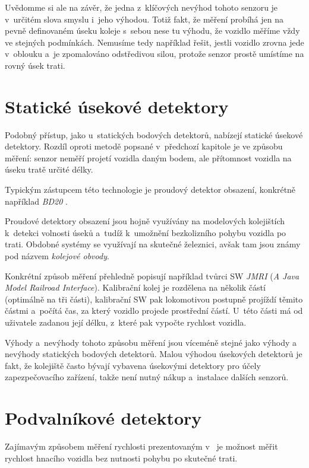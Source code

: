 Uvědomme si ale na závěr, že jedna z~klíčových nevýhod tohoto senzoru je
v~určitém slova smyslu i~jeho výhodou. Totiž fakt, že měření probíhá jen na pevně
definovaném úseku koleje s~sebou nese tu výhodu, že vozidlo měříme vždy ve
stejných podmínkách. Nemusíme tedy například řešit, jestli vozidlo zrovna jede
v~oblouku a~je zpomalováno odstředivou silou, protože senzor prostě umístíme
na rovný úsek trati.

\section{Statické úsekové detektory}
\label{sec:det-usek}

Podobný přístup, jako u~statických bodových detektorů, nabízejí statické
úsekové detektory. Rozdíl oproti metodě popsané v~předchozí kapitole je
ve způsobu měření: senzor neměří projetí vozidla daným bodem, ale přítomnost
vozidla na úseku tratě určité délky.

Typickým zástupcem této technologie je proudový detektor obsazení, konkrétně
například \textit{BD20} \cite{bd20}.

Proudové detektory obsazení jsou hojně využívány na modelových kolejištích k~detekci
volnosti úseků a~tudíž k~umožnění bezkolizního pohybu vozidla po trati.
Obdobné systémy se využívají na skutečné železnici, avšak tam jsou známy pod
názvem \textit{kolejové obvody}.

Konkrétní způsob měření přehledně popisují například tvůrci SW \textit{JMRI}
\cite{jmri:speedometer} (\textit{A Java Model Railroad Interface}).
Kalibrační kolej je rozdělena na několik částí (optimálně na tři části),
kalibrační SW pak lokomotivou postupně projíždí těmito částmi a~počítá čas, za
který vozidlo projede prostřední částí. U~této části má od uživatele zadanou
její délku, z~které pak vypočte rychlost vozidla.

Výhody a~nevýhody tohoto způsobu měření jsou víceméně stejné jako výhody a
nevýhody statických bodových detektorů. Malou výhodou úsekových detektorů je
fakt, že kolejiště často bývají vybavena úsekovými detektory pro účely
zapezpečovacího zařízení, takže není nutný nákup a~instalace dalších senzorů.

\section{Podvalníkové detektory}
\label{sec:det-podval}

Zajímavým způsobem měření rychlosti prezentovaným v~\cite{bachrus}
je možnost měřit rychlost hnacího vozidla bez nutnosti pohybu po skutečné trati.


